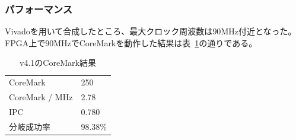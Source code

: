 \documentclass[dvipdfmx,10pt,a4paper,titlepage]{jsarticle}
\begin{document}
    \subsubsection{パフォーマンス}
    Vivadoを用いて合成したところ、最大クロック周波数は$90\mathrm{MHz}$付近となった。
    FPGA上で$90\mathrm{MHz}$でCoreMarkを動作した結果は表~\ref{tab:v4.1}の通りである。
    \begin{table}[h]
        \begin{center}
            \caption{v4.1のCoreMark結果}\label{tab:v4.1}
            \begin{tabular}{ll}
                CoreMark & 250\\
                CoreMark / MHz & 2.78 \\
                IPC & 0.780 \\
                分岐成功率 & 98.38\% \\
            \end{tabular}
        \end{center}
    \end{table}
\end{document}
